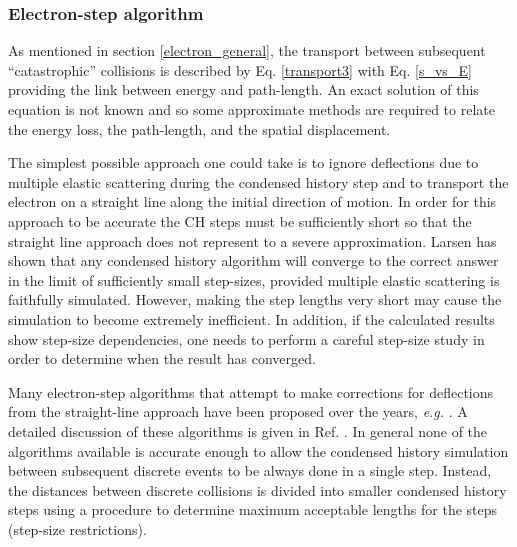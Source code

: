 \subsubsection{Electron-step algorithm}
\label{es_algorithm}
\setcounter{equation}{0}

As mentioned in section \ref{electron_general}, 
the transport between 
subsequent ``catastrophic'' collisions is described by 
Eq. \eqref{transport3} with Eq. \eqref{s_vs_E} providing 
the link between energy and path-length. An exact solution 
of this equation is not known and so some approximate 
methods are required to relate the 
energy loss, the path-length, and the spatial displacement. 

The simplest possible 
approach one could take is to ignore deflections due 
to multiple elastic scattering 
during the condensed history step and 
to transport the electron on a straight line along the initial 
direction of motion. In order for this approach to 
be accurate the CH steps must be sufficiently short so  
that the straight line approach does not represent to a 
severe approximation. Larsen has shown \cite{La92} that 
any condensed history algorithm will converge to the correct 
answer in the limit of sufficiently small step-sizes, provided 
multiple elastic scattering is faithfully simulated. 
However, making the step lengths very short may 
cause the simulation to become extremely inefficient. 
In addition, if the calculated results show step-size 
dependencies, one needs to perform a careful step-size 
study in order to determine when the result has 
converged. 

Many electron-step algorithms that attempt to make 
corrections for deflections from the straight-line 
approach have been proposed over the years, {\em e.g.} 
\cite{Be63,BR87,Fe93,Ka96b}. A detailed discussion of these 
algorithms is given in Ref. \cite{KB97a}.  In general 
none of the algorithms available is accurate enough 
to allow the condensed history simulation between 
subsequent discrete events to be always done in a single 
step. Instead, the distances between discrete collisions 
is divided into smaller condensed history steps using 
a procedure to determine maximum acceptable 
lengths for the steps (step-size restrictions). 

